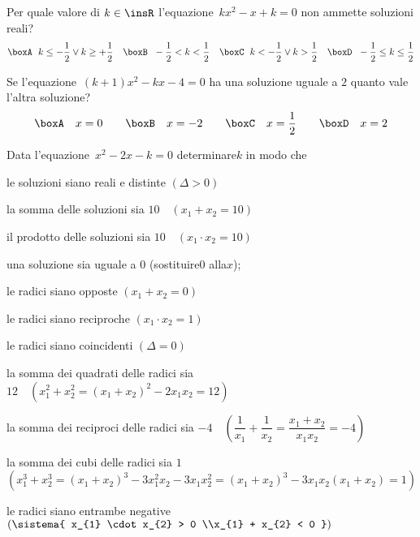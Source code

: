 \begin{esercizio}
 \label{ese:3.105}
 Per quale valore di \(k \in \insR\) l'equazione~\(kx^{2}-x + k = 0\) non 
ammette soluzioni reali?
\[\boxA\;~ k \leq-\dfrac{1}{2} \vee k \geq + \dfrac{1}{2}\quad\boxB\;~ - 
\dfrac{1}{2} 
< k < \dfrac{1}{2}\quad\boxC\;~ k <-\dfrac{1}{2} \vee k > 
\dfrac{1}{2}\quad\boxD\;~ - 
\dfrac{1}{2} \leq k \leq \dfrac{1}{2}\]
\end{esercizio}

\begin{esercizio}
 \label{ese:3.111}
Se l'equazione~\((k + 1) x^{2}-kx-4 = 0\) ha una soluzione uguale a \(2\) 
quanto 
vale l'altra soluzione?
\[\boxA\quad x = 0\qquad\boxB\quad x =-2\qquad\boxC\quad x = 
\dfrac{1}{2}\qquad\boxD\quad x = 2\]
\end{esercizio}

\begin{esercizio}[\Ast]
 \label{ese:3.97}
Data l'equazione~\(x^{2}-2 x-k = 0\) determinare\(k\) in modo che
\begin{enumeratea}
\item le soluzioni siano reali e distinte \quad\((\Delta>0)\)
\item la somma delle soluzioni sia \(10 \quad (x_{1} + x_{2} = 10)\)
\item il prodotto delle soluzioni sia \(10 \quad (x_{1} \cdot x_{2} = 10)\)
\item una soluzione sia uguale a \(0\) \quad (sostituire\(0\) alla\(x\));~
\item le radici siano opposte \quad \((x_{1} + x_{2} = 0)\)
\item le radici siano reciproche \quad \((x_{1} \cdot x_{2} = 1)\)
\item le radici siano coincidenti \quad \((\Delta=0)\)
\item la somma dei quadrati delle radici sia \(12 \quad \left(x_{1}^{2} + 
x_{2}^{2} = (x_{1} + x_{2})^{2}-2x_{1} x_{2} = 12\right)\)
\item la somma dei reciproci delle radici sia \(-4 \quad 
\left(\dfrac{1}{x_{1}} + 
\dfrac{1}{x_{2}} = \dfrac{x_{1} +x_{2}}{x_{1} x_{2}} =-4 \right)\)
\item la somma dei cubi delle radici sia \(1\) \protect\\ \(\left( 
x_{1}^{3} + 
x_{2}^{3} = (x_{1} + x_{2})^{3}-3x_{1}^{2} x_{2}-3x_{1} x_{2}^{2} = (x_{1} 
+ 
x_{2})^{3}-3x_{1} x_{2} (x_{1} + x_{2}) = 1\right)\)
\item le radici siano entrambe negative \(\left(\sistema{ 
x_{1} 
\cdot x_{2} > 0 \\x_{1} + x_{2} < 0 }\right)\)
\end{enumeratea}
\end{esercizio}

